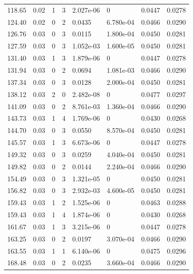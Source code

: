 \documentclass[preview]{standalone}
\begin{document}
{{{\begin{tabular}{L{1.2cm}C{1.2cm} C{0.3cm}C{0.5cm} C{1.4cm}C{1.4cm} C{1.4cm}C{1.4cm}}
  118.65  &  0.02  & 1     &  3 &  2.027e-06  & 0  & 0.0447 &  0.0278   \\ 
  124.40  &  0.02  & 0     &  2 &  0.0435  & 6.780e-04  & 0.0466 &  0.0290   \\ 
  126.76  &  0.03  & 0     &  3 &  0.0115  & 1.800e-04  & 0.0450 &  0.0281   \\ 
  127.59  &  0.03  & 0     &  3 &  1.052e-03  & 1.600e-05  & 0.0450 &  0.0281   \\ 
  131.40  &  0.03  & 1     &  3 &  1.879e-06  & 0  & 0.0447 &  0.0278   \\ 
  131.94  &  0.03  & 0     &  2 &  0.0694  & 1.081e-03  & 0.0466 &  0.0290   \\ 
  137.34  &  0.03  & 0     &  3 &  0.0128  & 2.000e-04  & 0.0450 &  0.0281   \\ 
  138.12  &  0.03  & 2     &  0 &  2.482e-08  & 0  & 0.0477 &  0.0297   \\ 
  141.09  &  0.03  & 0     &  2 &  8.761e-03  & 1.360e-04  & 0.0466 &  0.0290   \\ 
  143.73  &  0.03  & 1     &  4 &  1.769e-06  & 0  & 0.0430 &  0.0268   \\ 
  144.70  &  0.03  & 0     &  3 &  0.0550  & 8.570e-04  & 0.0450 &  0.0281   \\ 
  145.57  &  0.03  & 1     &  3 &  6.673e-06  & 0  & 0.0447 &  0.0278   \\ 
  149.32  &  0.03  & 0     &  3 &  0.0259  & 4.040e-04  & 0.0450 &  0.0281   \\ 
  149.82  &  0.03  & 0     &  2 &  0.0144  & 2.240e-04  & 0.0466 &  0.0290   \\ 
  154.49  &  0.03  & 0     &  3 &  1.321e-05  & 0  & 0.0450 &  0.0281   \\ 
  156.82  &  0.03  & 0     &  3 &  2.932e-03  & 4.600e-05  & 0.0450 &  0.0281   \\ 
  159.43  &  0.03  & 1     &  2 &  1.525e-06  & 0  & 0.0463 &  0.0288   \\ 
  159.43  &  0.03  & 1     &  4 &  1.874e-06  & 0  & 0.0430 &  0.0268   \\ 
  161.67  &  0.03  & 1     &  3 &  3.215e-06  & 0  & 0.0447 &  0.0278   \\ 
  163.25  &  0.03  & 0     &  2 &  0.0197  & 3.070e-04  & 0.0466 &  0.0290   \\ 
  163.55  &  0.03  & 1     &  1 &  6.140e-06  & 0  & 0.0475 &  0.0296   \\ 
  168.48  &  0.03  & 0     &  2 &  0.0235  & 3.660e-04  & 0.0466 &  0.0290   \\ 

\end{tabular}}}}
\end{document}
